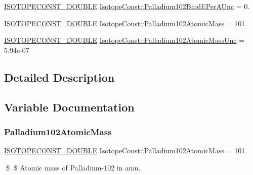 \begin{DoxyCompactItemize}
\mbox{\hyperlink{group___isotope_const-_macros_ga8f45a7272ce02c0b4c65c44636ed719a}{I\+S\+O\+T\+O\+P\+E\+C\+O\+N\+S\+T\+\_\+\+D\+O\+U\+B\+LE}} \mbox{\hyperlink{group___isotope_const-_palladium-_pd102_gae1e23faf1106d57e5866d9e08bc1d555}{Isotope\+Const\+::\+Palladium102\+Bind\+E\+Per\+A\+Unc}} = 0.
\item 
\mbox{\hyperlink{group___isotope_const-_macros_ga8f45a7272ce02c0b4c65c44636ed719a}{I\+S\+O\+T\+O\+P\+E\+C\+O\+N\+S\+T\+\_\+\+D\+O\+U\+B\+LE}} \mbox{\hyperlink{group___isotope_const-_palladium-_pd102_ga7d854370fed64e943d538e5b0a8fb6a2}{Isotope\+Const\+::\+Palladium102\+Atomic\+Mass}} = 101.
\item 
\mbox{\hyperlink{group___isotope_const-_macros_ga8f45a7272ce02c0b4c65c44636ed719a}{I\+S\+O\+T\+O\+P\+E\+C\+O\+N\+S\+T\+\_\+\+D\+O\+U\+B\+LE}} \mbox{\hyperlink{group___isotope_const-_palladium-_pd102_ga0132518450adeebb25515b25119f6144}{Isotope\+Const\+::\+Palladium102\+Atomic\+Mass\+Unc}} = 5.\+94e-\/07
\end{DoxyCompactItemize}


\subsection{Detailed Description}


\subsection{Variable Documentation}
\mbox{\label{group___isotope_const-_palladium-_pd102_ga7d854370fed64e943d538e5b0a8fb6a2}} 
\subsubsection{\texorpdfstring{Palladium102\+Atomic\+Mass}{Palladium102AtomicMass}}
{\footnotesize\ttfamily \mbox{\hyperlink{group___isotope_const-_macros_ga8f45a7272ce02c0b4c65c44636ed719a}{I\+S\+O\+T\+O\+P\+E\+C\+O\+N\+S\+T\+\_\+\+D\+O\+U\+B\+LE}} Isotope\+Const\+::\+Palladium102\+Atomic\+Mass = 101.}

\$ \$ Atomic mass of Palladium-\/102 in amu. \mbox{\label{group___isotope_const-_palladium-_pd102_ga0132518450adeebb25515b25119f6144}} 
